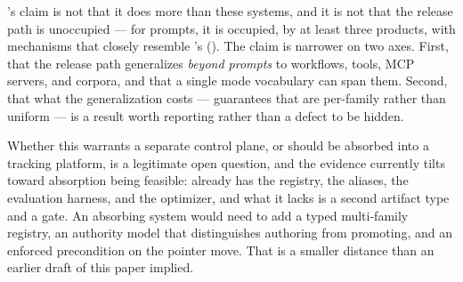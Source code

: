 \sys's claim is not that it does more than these systems, and it is not that the
release path is unoccupied --- for prompts, it is occupied, by at least three
products, with mechanisms that closely resemble \sys's
(). The claim is narrower on two axes. First, that
the release path generalizes \emph{beyond prompts} to workflows, tools, MCP
servers, and corpora, and that a single mode vocabulary can span them. Second, that
what the generalization costs --- guarantees that are per-family rather than
uniform --- is a result worth reporting rather than a defect to be hidden.

Whether this warrants a separate control plane, or should be absorbed into a
tracking platform, is a legitimate open question, and the evidence currently tilts
toward absorption being feasible: \mlflow{} already has the registry, the aliases,
the evaluation harness, and the optimizer, and what it lacks is a second artifact
type and a gate. An absorbing system would need to add a typed multi-family
registry, an authority model that distinguishes authoring from promoting, and an
enforced precondition on the pointer move. That is a smaller distance than an
earlier draft of this paper implied.
